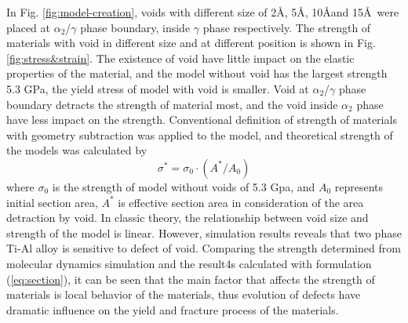 \documentclass[materials,article,submit,moreauthors,pdftex,10pt,a4paper]{Definitions/mdpi}
\begin{document}
In Fig. \ref{fig:model-creation}, voids with different size of 2\AA, 5\AA, 10\AA and 15\AA\ were placed  at $\alpha_2$/$\gamma$ phase boundary, inside $\gamma$ phase respectively. The strength of materials with void in different size and at different position is shown in Fig.\ref{fig:stress&strain}. The existence of void have little impact on the elastic properties of the material, and the model without void has the largest strength 5.3 GPa, the yield stress of model with void is smaller. Void at $\alpha_2$/$\gamma$ phase boundary  detracts the strength of  material most, and the void inside $\alpha_2$ phase  have less impact on the strength.          
Conventional definition of strength of materials with geometry subtraction was applied to the model, and theoretical strength of the models was calculated by
\begin{equation} \label{eq:section} 
\sigma^* = \sigma_0 \cdot({A^*}/{A_0})
\end{equation}
where $\sigma_0$ is the strength of model without voids of 5.3 Gpa, and $A_0$ represents initial section area,  $A^*$ is effective section area in consideration of the area detraction by void.  In classic theory, the relationship between void size and strength of the model is linear. However, simulation results reveals that two phase Ti-Al alloy is sensitive to defect of void.  Comparing the strength determined from molecular dynamics simulation and the result4s calculated with formulation (\ref{eq:section}), it can be seen that the main factor that affects the strength of materials is local behavior of the materials, thus evolution of defects have dramatic influence on the yield and fracture process of the materials.
\end{document}
